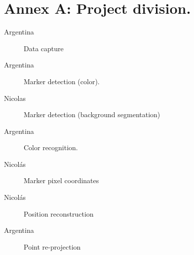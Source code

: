 \documentclass[a4paper,12pt]{article}
\begin{document}
\section*{Annex A: Project division.}
\begin{description}
\item[Argentina] Data capture
\item[Argentina] Marker detection (color).
\item[Nicolas] Marker detection (background segmentation)
\item [Argentina] Color recognition.
\item[Nicolás] Marker pixel coordinates
\item[Nicolás]Position reconstruction
\item[Argentina]Point re-projection

\end{description}
\nocite{*}





\end{document}
